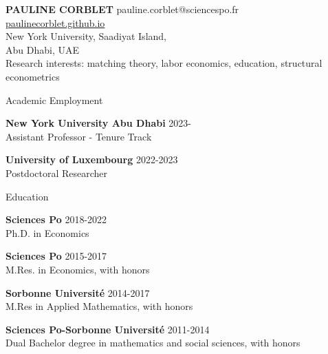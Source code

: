 \documentclass{resume} %
\begin{document}
{\bf \large PAULINE CORBLET} \hfill pauline.corblet@sciencespo.fr\\
{\phantom{smth}} \hfill \href{https://paulinecorblet.github.io}{paulinecorblet.github.io} \\
New York University, Saadiyat Island, \\ 
Abu Dhabi, UAE \\

{\large Research interests: matching theory, labor economics, education, structural econometrics}


\begin{rSection}{Academic Employment}

{\bf New York University Abu Dhabi} \hfill {2023-} \\
  Assistant Professor - Tenure Track

{\bf University of Luxembourg} \hfill {2022-2023} \\
Postdoctoral Researcher

\end{rSection}

\begin{rSection}{Education}

{\bf Sciences Po} \hfill {2018-2022}
\\ Ph.D. in Economics

{\bf Sciences Po} \hfill {2015-2017}
\\ M.Res. in Economics, with honors

{\bf Sorbonne Université} \hfill {2014-2017}
\\ M.Res in Applied Mathematics, with honors

{\bf Sciences Po-Sorbonne Université} \hfill {2011-2014}
\\ Dual Bachelor degree in mathematics and social sciences, with honors


\end{rSection}
%
%
%
\end{document}
